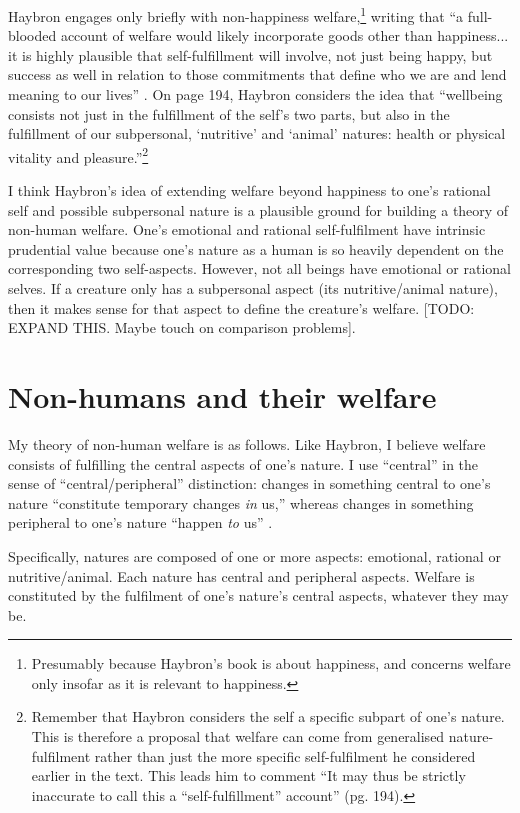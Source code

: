 \documentclass{article}
\begin{document}
Haybron engages only briefly with non-happiness welfare,\footnote{Presumably because Haybron's book is about happiness, and concerns welfare only insofar as it is relevant to happiness.} writing that ``a full-blooded account of welfare would likely incorporate goods other than happiness... it is highly plausible that self-fulfillment will involve, not just being happy, but success as well in relation to those commitments that define who we are and lend meaning to our lives'' \citep[193]{haybron2008pursuit}. On page 194, Haybron considers the idea that ``wellbeing consists not just in the fulfillment of the self's two parts, but also in the fulfillment of our subpersonal, `nutritive' and `animal' natures: health or physical vitality and pleasure.''\footnote{Remember that Haybron considers the self a specific subpart of one's nature. This is therefore a proposal that welfare can come from generalised nature-fulfilment rather than just the more specific self-fulfilment he considered earlier in the text. This leads him to comment ``It may thus be strictly inaccurate to call this a ``self-fulfillment'' account'' (pg. 194).} 

I think Haybron's idea of extending welfare beyond happiness \textemdash{} to one's rational self and possible subpersonal nature \textemdash{} is a plausible ground for building a theory of non-human welfare. One's emotional and rational self-fulfilment have intrinsic prudential value because one's nature as a human is so heavily dependent on the corresponding two self-aspects. However, not all beings have emotional or rational selves. If a creature only has a subpersonal aspect (its nutritive/animal nature), then it makes sense for that aspect to define the creature's welfare. [TODO: EXPAND THIS. Maybe touch on comparison problems].

\section{Non-humans and their welfare}

My theory of non-human welfare is as follows. Like Haybron, I believe welfare consists of fulfilling the central aspects of one's nature. I use ``central'' in the sense of ``central/peripheral'' distinction: changes in something central to one's nature ``constitute temporary changes \textit{in} us,'' whereas changes in something peripheral to one's nature ``happen \textit{to} us'' \citep[pg. 183]{haybron2008pursuit}. 

Specifically, natures are composed of one or more aspects: emotional, rational or nutritive/animal. Each nature has central and peripheral aspects. Welfare is constituted by the fulfilment of one's nature's central aspects, whatever they may be. 
\end{document}

